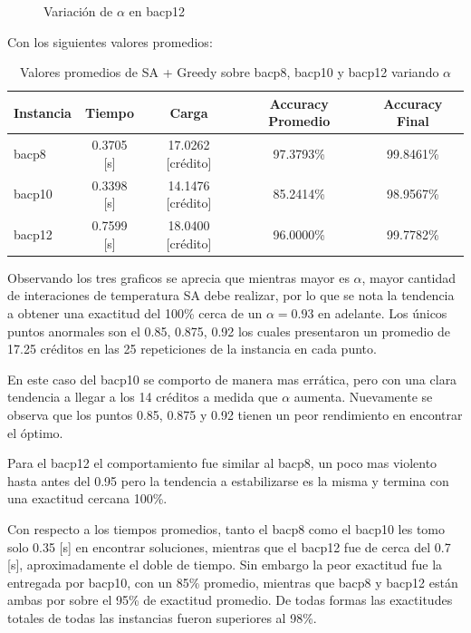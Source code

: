 \documentclass[letterpaper,10pt]{article}
\begin{document}
\begin{figure}[H]
        \caption{Variación de $\alpha$ en bacp12}
        \label{fig:alpha3}
    \endminipage
\end{figure}

Con los siguientes valores promedios:

\begin{table}[H]
  \centering
  \begin{tabular}{@{}lcccc@{}}
    \toprule[1pt]
    Instancia & Tiempo & Carga & Accuracy Promedio & Accuracy Final \\
    \midrule
     bacp8 & 0.3705 [s] & 17.0262 [crédito] & 97.3793\% & 99.8461\% \\
    bacp10 & 0.3398 [s] & 14.1476 [crédito] & 85.2414\% & 98.9567\% \\
    bacp12 & 0.7599 [s] & 18.0400 [crédito] & 96.0000\% & 99.7782\% \\
    \bottomrule
  \end{tabular}
  \caption{Valores promedios de SA + Greedy sobre bacp8, bacp10 y bacp12 variando $\alpha$}
\end{table}

Observando los tres graficos se aprecia que mientras mayor es $\alpha$, mayor cantidad de interaciones de temperatura SA debe realizar, por lo que se nota la tendencia a obtener una exactitud del 100\% cerca de un $\alpha = 0.93$ en adelante. Los únicos puntos anormales son el 0.85, 0.875, 0.92 los cuales presentaron un promedio de 17.25 créditos en las 25 repeticiones de la instancia en cada punto.

En este caso del bacp10 se comporto de manera mas errática, pero con una clara tendencia a llegar a los 14 créditos a medida que $\alpha$ aumenta. Nuevamente se observa que los puntos 0.85, 0.875 y 0.92 tienen un peor rendimiento en encontrar el óptimo.

Para el bacp12 el comportamiento fue similar al bacp8, un poco mas violento hasta antes del 0.95 pero la tendencia a estabilizarse es la misma y termina con una exactitud cercana 100\%.

Con respecto a los tiempos promedios, tanto el bacp8 como el bacp10 les tomo solo 0.35 [s] en encontrar soluciones, mientras que el bacp12 fue de cerca del 0.7 [s], aproximadamente el doble de tiempo. Sin embargo la peor exactitud fue la entregada por bacp10, con un 85\% promedio, mientras que bacp8 y bacp12 están ambas por sobre el 95\% de exactitud promedio. De todas formas las exactitudes totales de todas las instancias fueron superiores al 98\%.
\end{document}
